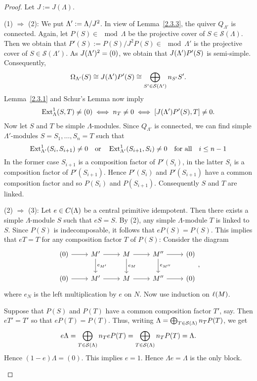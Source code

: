 \begin{proof}
Let $J:=J(\Lambda)$.
\begin{addmargin}[1cm]{0cm}
\hspace{-1cm}(1) $\Rightarrow$ (2): We put $\Lambda' := \Lambda/J^2$. In view of Lemma~\ref{2.3.3}, the
  quiver $Q_{\Lambda'}$ is connected. Again, let $P(S) \in \mod{\Lambda}$ be the projective
  cover of $S \in \mathcal S(\Lambda)$. Then we obtain that $P'(S) := P(S)/J^2 P(S) \in \mod{\Lambda'}$ is
  the projective cover of $S \in \mathcal S(\Lambda')$. As $J(\Lambda')^2 = (0)$, we obtain that $J(\Lambda')P'(S)$ is semi-simple. Consequently,
  \[
  \Omega_{\Lambda'}(S) \cong J(\Lambda')P'(S) \cong \bigoplus_{S' \in
  \mathcal S(\Lambda')} n_{S'}S'.
  \]
  Lemma~\ref{2.3.1} and Schur's Lemma now imply
  \begin{align*}
    \operatorname{Ext}_\Lambda^1(S,T) \neq (0) \iff n_T \neq 0 \iff [J(\Lambda')P'(S),T] \neq 0.
  \end{align*}
  Now let $S$ and $T$ be simple $\Lambda$-modules. Since $Q_{\Lambda'}$ is connected, we can find simple $\Lambda'$-modules $S=S_1, \ldots, S_n = T$ such that
    \[ \operatorname{Ext}_{\Lambda'}^1(S_i,S_{i+1}) \neq 0 \quad\text{or}\quad \operatorname{Ext}_{\Lambda'}^1(S_{i+1},S_i) \neq 0 \quad\text{for all}\quad i \le n-1
     \]
  In the former case $S_{i+1}$ is a composition factor of $P'(S_i)$, in the
  latter $S_i$ is a composition factor of $P'(S_{i+1})$. Hence $P'(S_i)$ and
  $P'(S_{i+1})$ have a common composition factor and so $P(S_i)$ and
  $P(S_{i+1})$. Consequently $S$ and $T$ are linked.

\hspace{-1cm}(2) $\Rightarrow$ (3): Let $e \in C(\Lambda)$ be a central primitive idempotent. Then there
  exists a simple $\Lambda$-module $S$ such that $eS = S$. By (2), any simple $\Lambda$-module $T$ is linked to $S$. Since $P(S)$ is indecomposable, it follows that $eP(S) = P(S)$. This implies 
  that $eT = T$ for any composition factor $T$ of $P(S)$: Consider the diagram
    \[ \begin{tikzcd}
        (0) \rar& M' \dar["e_{M'}"] \rar& M \dar["e_{M}"] \rar& M''
        \dar["e_{M''}"] \rar& (0)\\
        (0) \rar& M' \rar& M \rar& M'' \rar& (0)
      \end{tikzcd},
    \]
    where $e_N$ is the left multiplication by $e$ on $N$. Now use induction on $\ell(M)$.
    
  Suppose that $P(S)$  and $P(T)$ have a common composition factor $T'$, say. Then $eT' = T'$ so that $eP(T) = P(T)$. Thus, writing $\Lambda=\bigoplus_{T \in  \mathcal S(\Lambda)} n_T P(T)$, we get
  \[
  e\Lambda = \bigoplus_{T \in \mathcal S(\Lambda)} n_T eP(T) = \bigoplus_{T \in  \mathcal S(\Lambda)} n_T P(T) = \Lambda.
  \]
  Hence $(1-e)\Lambda = (0)$. This implies $e = 1$. Hence $\Lambda{}e = \Lambda$ is the only block.


\end{addmargin}
\end{proof}
